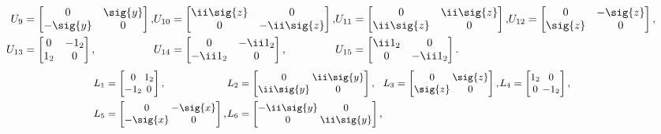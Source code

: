 \begin{unit}
\[\begin{aligned}
\mkern-18mu U_9&=\begin{bmatrix}0&\sig{y}\\-\sig{y}&0\end{bmatrix},&
\mkern-18mu U_{10}&=\begin{bmatrix}\ii\sig{z}&0\\0&-\ii\sig{z}\end{bmatrix},&
\mkern-18mu U_{11}&=\begin{bmatrix}0&\ii\sig{z}\\\ii\sig{z}&0\end{bmatrix},&
\mkern-18mu U_{12}&=\begin{bmatrix}0&-\sig{z}\\\sig{z}&0\end{bmatrix},\\
\mkern-18mu U_{13}&=\begin{bmatrix}0&-1_2\\ 1_2&0\end{bmatrix},&
\mkern-18mu U_{14}&=\begin{bmatrix}0&-\ii 1_2\\-\ii 1_2&0\end{bmatrix},&
\mkern-18mu U_{15}&=\begin{bmatrix}\ii 1_2&0\\0&-\ii 1_2\end{bmatrix}.
\end{aligned}
\]
%
\[\small
\setlength{\arraycolsep}{1pt}
\!\begin{aligned}
\mkern-18mu L_1&=\begin{bmatrix}0&1_2\\- 1_2&0\end{bmatrix},&
\mkern-18mu L_2&=\begin{bmatrix}0&\ii\sig{y}\\\ii\sig{y}&0\end{bmatrix},&
\mkern-18mu L_3&=\begin{bmatrix}0&\sig{z}\\\sig{z}&0\end{bmatrix},&
\mkern-18mu L_4&=\begin{bmatrix}1_2&0\\0&-1_2\end{bmatrix},\\
\mkern-18mu L_5&=\begin{bmatrix}0&-\sig{x}\\-\sig{x}&0\end{bmatrix},&
\mkern-18mu L_6&=\begin{bmatrix}-\ii\sig{y}&0\\0&\ii\sig{y}\end{bmatrix},&

\end{aligned}\]
\end{unit}
